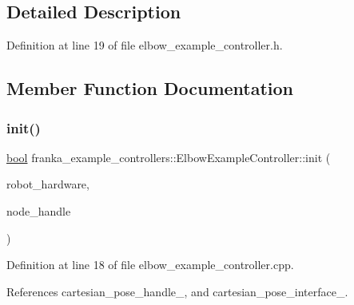 \subsection{Detailed Description}


Definition at line 19 of file elbow\+\_\+example\+\_\+controller.\+h.



\subsection{Member Function Documentation}
\mbox{\label{classfranka__example__controllers_1_1ElbowExampleController_ae289eee8c389d5b2d9e2f2cf13fcc475}} 
\subsubsection{\texorpdfstring{init()}{init()}}
{\footnotesize\ttfamily \hyperlink{classbool}{bool} franka\+\_\+example\+\_\+controllers\+::\+Elbow\+Example\+Controller\+::init (\begin{DoxyParamCaption}\item[{hardware\+\_\+interface\+::\+Robot\+HW $\ast$}]{robot\+\_\+hardware,  }\item[{ros\+::\+Node\+Handle \&}]{node\+\_\+handle }\end{DoxyParamCaption})\hspace{0.3cm}{\ttfamily [override]}}



Definition at line 18 of file elbow\+\_\+example\+\_\+controller.\+cpp.



References cartesian\+\_\+pose\+\_\+handle\+\_\+, and cartesian\+\_\+pose\+\_\+interface\+\_\+.


